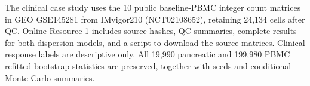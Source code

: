 \documentclass[preprint,12pt]{elsarticle}
\theoremstyle{plain}
\theoremstyle{remark}
\begin{document}
The clinical case study uses the 10 public baseline-PBMC integer count
matrices in GEO GSE145281 from IMvigor210 (NCT02108652), retaining 24,134
cells after QC. Online Resource 1 includes source hashes, QC summaries,
complete results for both dispersion models, and a script to download the
source matrices. Clinical response labels are descriptive only. All 19,990
pancreatic and 199,980 PBMC refitted-bootstrap statistics are preserved,
together with seeds and conditional Monte Carlo summaries.








\end{document}
